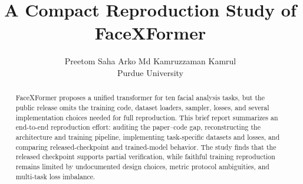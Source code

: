 \documentclass[10pt,twocolumn,letterpaper]{article}
\title{A Compact Reproduction Study of FaceXFormer}
\author{Preetom Saha Arko \quad Md Kamruzzaman Kamrul\\
Purdue University}
\begin{document}
\maketitle

\begin{abstract}
FaceXFormer proposes a unified transformer for ten facial analysis tasks, but the public release omits the training code, dataset loaders, sampler, losses, and several implementation choices needed for full reproduction. This brief report summarizes an end-to-end reproduction effort: auditing the paper--code gap, reconstructing the architecture and training pipeline, implementing task-specific datasets and losses, and comparing released-checkpoint and trained-model behavior. The study finds that the released checkpoint supports partial verification, while faithful training reproduction remains limited by undocumented design choices, metric protocol ambiguities, and multi-task loss imbalance.
\end{abstract}


{
    \small
    
    
}
\end{document}
